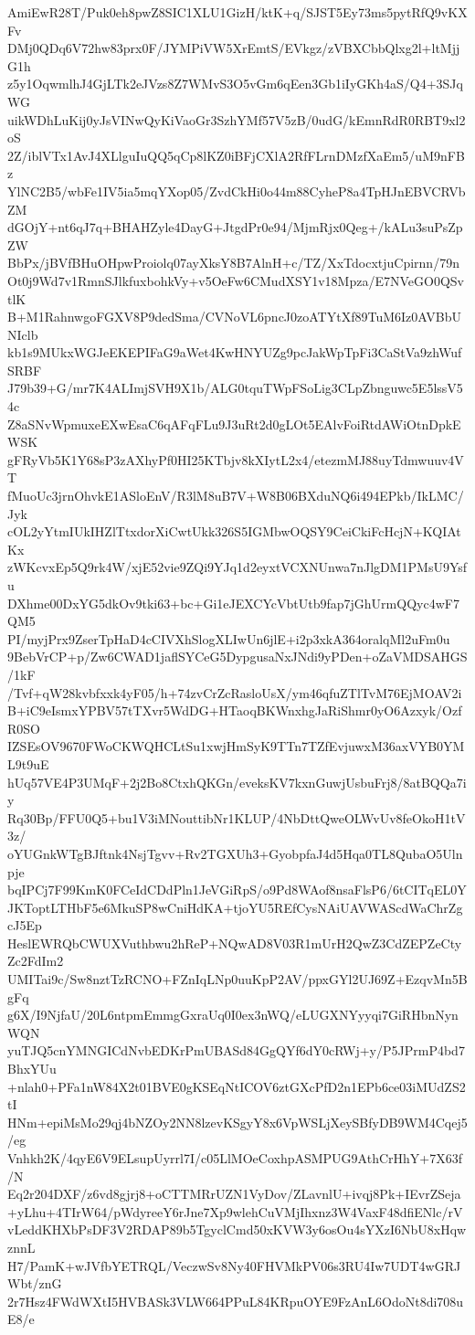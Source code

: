 AmiEwR28T/Puk0eh8pwZ8SIC1XLU1GizH/ktK+q/SJST5Ey73ms5pytRfQ9vKXFv
DMj0QDq6V72hw83prx0F/JYMPiVW5XrEmtS/EVkgz/zVBXCbbQlxg2l+ltMjjG1h
z5y1OqwmlhJ4GjLTk2eJVzs8Z7WMvS3O5vGm6qEen3Gb1iIyGKh4aS/Q4+3SJqWG
uikWDhLuKij0yJsVINwQyKiVaoGr3SzhYMf57V5zB/0udG/kEmnRdR0RBT9xl2oS
2Z/iblVTx1AvJ4XLlguIuQQ5qCp8lKZ0iBFjCXlA2RfFLrnDMzfXaEm5/uM9nFBz
YlNC2B5/wbFe1IV5ia5mqYXop05/ZvdCkHi0o44m88CyheP8a4TpHJnEBVCRVbZM
dGOjY+nt6qJ7q+BHAHZyle4DayG+JtgdPr0e94/MjmRjx0Qeg+/kALu3suPsZpZW
BbPx/jBVfBHuOHpwProiolq07ayXksY8B7AlnH+c/TZ/XxTdocxtjuCpirnn/79n
Ot0j9Wd7v1RmnSJlkfuxbohkVy+v5OeFw6CMudXSY1v18Mpza/E7NVeGO0QSvtlK
B+M1RahnwgoFGXV8P9dedSma/CVNoVL6pncJ0zoATYtXf89TuM6Iz0AVBbUNIclb
kb1s9MUkxWGJeEKEPIFaG9aWet4KwHNYUZg9pcJakWpTpFi3CaStVa9zhWufSRBF
J79b39+G/mr7K4ALImjSVH9X1b/ALG0tquTWpFSoLig3CLpZbnguwc5E5lssV54c
Z8aSNvWpmuxeEXwEsaC6qAFqFLu9J3uRt2d0gLOt5EAlvFoiRtdAWiOtnDpkEWSK
gFRyVb5K1Y68sP3zAXhyPf0HI25KTbjv8kXIytL2x4/etezmMJ88uyTdmwuuv4VT
fMuoUc3jrnOhvkE1ASloEnV/R3lM8uB7V+W8B06BXduNQ6i494EPkb/IkLMC/Jyk
cOL2yYtmIUkIHZlTtxdorXiCwtUkk326S5IGMbwOQSY9CeiCkiFcHcjN+KQIAtKx
zWKcvxEp5Q9rk4W/xjE52vie9ZQi9YJq1d2eyxtVCXNUnwa7nJlgDM1PMsU9Ysfu
DXhme00DxYG5dkOv9tki63+bc+Gi1eJEXCYcVbtUtb9fap7jGhUrmQQyc4wF7QM5
PI/myjPrx9ZserTpHaD4cCIVXhSlogXLIwUn6jlE+i2p3xkA364oralqMl2uFm0u
9BebVrCP+p/Zw6CWAD1jaflSYCeG5DypgusaNxJNdi9yPDen+oZaVMDSAHGS/1kF
/Tvf+qW28kvbfxxk4yF05/h+74zvCrZcRasloUsX/ym46qfuZTlTvM76EjMOAV2i
B+iC9eIsmxYPBV57tTXvr5WdDG+HTaoqBKWnxhgJaRiShmr0yO6Azxyk/OzfR0SO
IZSEsOV9670FWoCKWQHCLtSu1xwjHmSyK9TTn7TZfEvjuwxM36axVYB0YML9t9uE
hUq57VE4P3UMqF+2j2Bo8CtxhQKGn/eveksKV7kxnGuwjUsbuFrj8/8atBQQa7iy
Rq30Bp/FFU0Q5+bu1V3iMNouttibNr1KLUP/4NbDttQweOLWvUv8feOkoH1tV3z/
oYUGnkWTgBJftnk4NsjTgvv+Rv2TGXUh3+GyobpfaJ4d5Hqa0TL8QubaO5Ulnpje
bqIPCj7F99KmK0FCeIdCDdPln1JeVGiRpS/o9Pd8WAof8nsaFlsP6/6tCITqEL0Y
JKToptLTHbF5e6MkuSP8wCniHdKA+tjoYU5REfCysNAiUAVWAScdWaChrZgcJ5Ep
HeslEWRQbCWUXVuthbwu2hReP+NQwAD8V03R1mUrH2QwZ3CdZEPZeCtyZc2FdIm2
UMITai9c/Sw8nztTzRCNO+FZnIqLNp0uuKpP2AV/ppxGYl2UJ69Z+EzqvMn5BgFq
g6X/I9NjfaU/20L6ntpmEmmgGxraUq0I0ex3nWQ/eLUGXNYyyqi7GiRHbnNynWQN
yuTJQ5cnYMNGICdNvbEDKrPmUBASd84GgQYf6dY0cRWj+y/P5JPrmP4bd7BhxYUu
+nlah0+PFa1nW84X2t01BVE0gKSEqNtICOV6ztGXcPfD2n1EPb6ce03iMUdZS2tI
HNm+epiMsMo29qj4bNZOy2NN8lzevKSgyY8x6VpWSLjXeySBfyDB9WM4Cqej5/eg
Vnhkh2K/4qyE6V9ELsupUyrrl7I/c05LlMOeCoxhpASMPUG9AthCrHhY+7X63f/N
Eq2r204DXF/z6vd8gjrj8+oCTTMRrUZN1VyDov/ZLavnlU+ivqj8Pk+IEvrZSeja
+yLhu+4TIrW64/pWdyreeY6rJne7Xp9wlehCuVMjIhxnz3W4VaxF48dfiENlc/rV
vLeddKHXbPsDF3V2RDAP89b5TgyclCmd50xKVW3y6osOu4sYXzI6NbU8xHqwznnL
H7/PamK+wJVfbYETRQL/VeczwSv8Ny40FHVMkPV06s3RU4Iw7UDT4wGRJWbt/znG
2r7Hsz4FWdWXtI5HVBASk3VLW664PPuL84KRpuOYE9FzAnL6OdoNt8di708uE8/e
